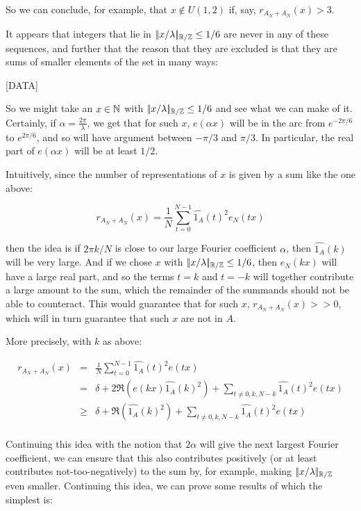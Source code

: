 \documentclass{article}
\theoremstyle{definition}
\theoremstyle{remark}
\numberwithin{equation}{section}
\begin{document}
So we can conclude, for example, that $x \notin U(1,2)$ if, say,
$r_{A_{N}+A_{N}}(x) > 3$.  

It appears that integers that lie in $|\!|x/\lambda|\!|_{\mathbb{R}/\mathbb{Z}} \leq 1/6$ are
never in any of these sequences, and further that the reason that they
are excluded is that they are sums of smaller elements of the set in
many ways: {\color{red}

[DATA]

}

So we might take an $x \in \mathbb{N}$ with $|\!|x/\lambda|\!|_{\mathbb{R}/\mathbb{Z}} \leq 1/6$ and
see what we can make of it.  Certainly, if
$\alpha = \frac{2\pi}{\lambda}$, we get that for such $x$,
$e(\alpha x)$ will be in the arc from $e^{-2\pi/6}$ to $e^{2\pi/6}$,
and so will have argument between $-\pi/3$ and $\pi/3$.  In
particular, the real part of $e(\alpha x)$ will be at least $1/2$.

Intuitively, since the number of representations of $x$ is given by a
sum like the one above:

\[r_{A_N+A_N}(x) = \frac 1N \sum_{t=0}^{N-1} \widehat{1_A}(t)^2
  e_N(tx)\]

then the idea is if $2\pi k/N$ is close to our large Fourier
coefficient $\alpha$, then $\widehat{1_A}(k)$ will be very large.  And
if we chose $x$ with $|\!|x/\lambda|\!|_{\mathbb{R}/\mathbb{Z}} \leq 1/6$, then $e_N(kx)$
will have a large real part, and so the terms $t = k$ and $t = -k$
will together contribute a large amount to the sum, which the
remainder of the summands should not be able to counteract.  This
would guarantee that for such $x$, $r_{A_N+A_N}(x) >> 0$, which will
in turn guarantee that such $x$ are not in $A$.

More precisely, with $k$ as above:

\begin{eqnarray*}
r_{A_N+A_N}(x) &=& \frac 1N \sum_{t=0}^{N-1} \widehat{1_A}(t)^2 e(tx)\\
 &=& \delta + 2\Re(e(kx)\widehat{1_A}(k)^2) + \sum_{t\neq 0,k,N-k}
 \widehat{1_A}(t)^2 e(tx)\\
 &\geq& \delta + \Re(\widehat{1_A}(k)^2) + \sum_{t\neq 0,k,N-k}
 \widehat{1_A}(t)^2 e(tx)\\
\end{eqnarray*}

Continuing this idea with the notion that $2\alpha$ will give the next
largest Fourier coefficient, we can ensure that this also contributes
positively (or at least contributes not-too-negatively) to the sum by,
for example, making $|\!|x/\lambda|\!|_{\mathbb{R}/\mathbb{Z}}$ even smaller.  Continuing
this idea, we can prove some results of which the simplest is: 
\end{document}
